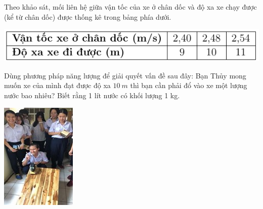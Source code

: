 \begin{enumerate}[label=\bfseries Câu \arabic*:]
{\begin{minipage}[l]{0.7\textwidth}
\begin{enumerate}[label=\alph*)]
				Theo khảo sát, mối liên hệ giữa vận tốc của xe ở chân dốc và độ xa xe chạy được (kể từ chân dốc) được thống kê trong bảng phía dưới.
				\begin{center}
					\includegraphics[scale=0.7]{../figs/VN10-2022-PH-TP029-7}
				\end{center}
				Dùng phương pháp năng lượng để giải quyết vấn đề sau đây: Bạn Thủy mong muốn xe của mình đạt được độ xa $\SI{10}{m}$ thì bạn cần phải đổ vào xe một lượng nước bao nhiêu? Biết rằng 1 lít nước có khối lượng 1 kg.
			\end{enumerate}
		\end{minipage}
		\begin{minipage}[r]{0.25\textwidth}
			\begin{flushright}
				\includegraphics[width=0.7\linewidth]{../figs/VN10-2022-PH-TP029-2}

\end{flushright}
\end{minipage}}
\end{enumerate}
